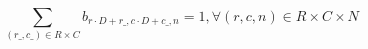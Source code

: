 \documentclass[10pt]{article}
\begin{document}
\[\sum_{(r\_, c\_) \in R \times C} b_{r \cdot D + r\_, c \cdot D + c\_, n} = 1, \forall (r,c,n) \in R \times C \times N\]
\end{document}
